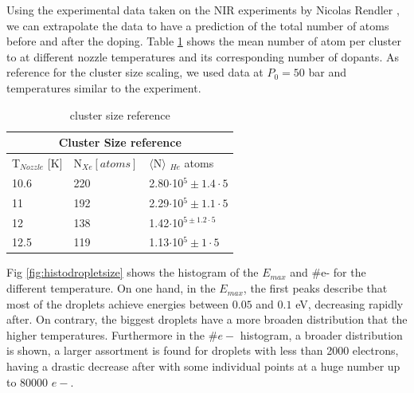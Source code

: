Using the experimental data taken on the NIR experiments by Nicolas Rendler \cite{rendler_einzelschuss_2017}, we can extrapolate the data to have a prediction of the total number of atoms before and after the doping. Table \ref{tab:clustersize} shows the mean number of atom per cluster to at different nozzle temperatures and its corresponding number of dopants. As reference for the cluster size scaling, we used data at $P_{0}=50$ bar and temperatures similar to the experiment. 

\begin{table}[t]
\centering
\begin{tabular}{|l|l|l|}\hline
\multicolumn{3}{|c|}{Cluster Size reference}                                                             \\\hline
T$_{Nozzle}$ {[}K{]}  & N$_{Xe} [atoms]$ & $\langle$N$\rangle$ $_{He}$ atoms \\ \hline
10.6                  & 220     & 2.80$\cdot$10$^{5}\pm1.4\cdot{5}$                      \\ \hline
11                    & 192     & 2.29$\cdot$10$^{5}\pm1.1\cdot{5}$                       \\ \hline
12                    & 138     & 1.42$\cdot$10$^{5\pm1.2\cdot{5}}$                      \\ \hline
12.5                  & 119     & 1.13$\cdot$10$^{5}\pm1\cdot{5}$                    \\ \hline
\end{tabular}
\caption{cluster size reference}
\label{tab:clustersize}
\end{table}




Fig \ref{fig:histodropletsize} shows the histogram of the $E_{max}$ and  $\#$e- for the different temperature. On one hand, in the $E_{max}$, the first peaks describe that most of the droplets achieve energies between $0.05$ and $0.1$ eV, decreasing rapidly after. On contrary, the biggest droplets have a more broaden distribution that the higher temperatures. Furthermore in the $\#e-$ histogram, a broader distribution is shown, a larger assortment is found for droplets with less than 2000 electrons, having a drastic decrease after with some individual points at a huge number up to 80000 $e-$.

